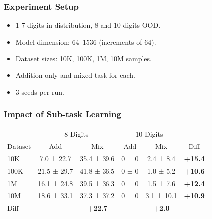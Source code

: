 \documentclass[14pt,aspectratio=169]{beamer}
\theoremstyle{remark}
\begin{document}
\begin{frame}
    \frametitle{Experiment Setup}
    \begin{itemize}
        \item 1-7 digits in-distribution, 8 and 10 digits OOD.
        \item Model dimension: 64--1536 (increments of 64).
        \item Dataset sizes: 10K, 100K, 1M, 10M samples.
        \item Addition-only and mixed-task for each.
        \item 3 seeds per run.
    \end{itemize}
\end{frame}

\begin{frame}
    \frametitle{Impact of Sub-task Learning}
    \begin{table}
        \centering
        \begin{tabular}{lccccc}
            \toprule
                    & \multicolumn{2}{c}{8 Digits} & \multicolumn{2}{c}{10 Digits}                                          \\
            Dataset & Add                          & Mix                           & Add   & Mix           & Diff           \\
            \midrule
            10K     & 7.0 ± 22.7                   & 35.4 ± 39.6                   & 0 ± 0 & 2.4 ± 8.4     & \textbf{+15.4} \\
            100K    & 21.5 ± 29.7                  & 41.8 ± 36.5                   & 0 ± 0 & 1.0 ± 5.2     & \textbf{+10.6} \\
            1M      & 16.1 ± 24.8                  & 39.5 ± 36.3                   & 0 ± 0 & 1.5 ± 7.6     & \textbf{+12.4} \\
            10M     & 18.6 ± 33.1                  & 37.3 ± 37.2                   & 0 ± 0 & 3.1 ± 10.1    & \textbf{+10.9} \\
            \midrule
            Diff    &                              & \textbf{+22.7}                &       & \textbf{+2.0} &                \\
            \bottomrule
        \end{tabular}
    \end{table}
\end{frame}
\end{document}
